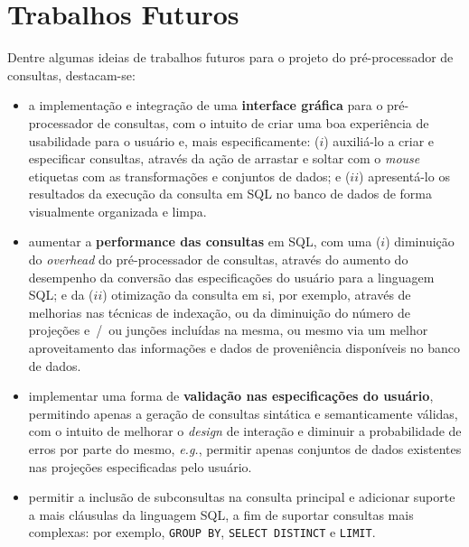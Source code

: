 \section{Trabalhos Futuros}

Dentre algumas ideias de trabalhos futuros para o projeto do pré-processador de consultas, destacam-se:

\begin{itemize}
    \item a implementação e integração de uma \textbf{interface gráfica} para o pré-processador de consultas, com o intuito de criar uma boa experiência de usabilidade para o usuário e, mais especificamente: (\(i\)) auxiliá-lo a criar e especificar consultas, através da ação de arrastar e soltar com o \textit{mouse} etiquetas com as transformações e conjuntos de dados; e (\(ii\)) apresentá-lo os resultados da execução da consulta em SQL no banco de dados de forma visualmente organizada e limpa.
    \item aumentar a \textbf{performance das consultas} em SQL, com uma (\(i\)) diminuição do \textit{overhead} do pré-processador de consultas, através do aumento do desempenho da conversão das especificações do usuário para a linguagem SQL; e da (\(ii\)) otimização da consulta em si, por exemplo, através de melhorias nas técnicas de indexação, ou da diminuição do número de projeções e~/~ou junções incluídas na mesma, ou mesmo via um melhor aproveitamento das informações e dados de proveniência disponíveis no banco de dados.
    \item implementar uma forma de \textbf{validação nas especificações do usuário}, permitindo apenas a geração de consultas sintática e semanticamente válidas, com o intuito de melhorar o \textit{design} de interação e diminuir a probabilidade de erros por parte do mesmo, \textit{e.g.}, permitir apenas conjuntos de dados existentes nas projeções especificadas pelo usuário.
    \item permitir a inclusão de subconsultas na consulta principal e adicionar suporte a mais cláusulas da linguagem SQL, a fim de suportar consultas mais complexas: por exemplo, \texttt{GROUP BY}, \texttt{SELECT DISTINCT} e \texttt{LIMIT}.
\end{itemize}
